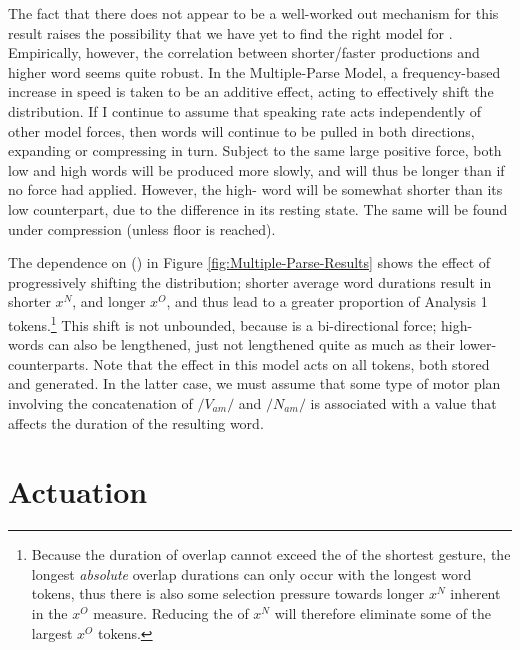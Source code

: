 The fact that there does not appear to be a well-worked out mechanism
for this result raises the possibility that we have yet to find the
right model for . Empirically, however, the correlation between
shorter/faster productions and higher word  seems quite robust.
In the Multiple-Parse Model, a frequency-based increase in 
speed is taken to be an additive effect, acting to effectively shift
the  distribution. If I continue to assume that speaking
rate acts independently of other model forces, then words will continue
to be pulled in both directions, expanding or compressing in turn.
Subject to the same large positive force, both low and high 
words will be produced more slowly, and will thus be longer than if
no force had applied. However, the high- word will be somewhat
shorter than its low  counterpart, due to the difference
in its resting state. The same will be found under compression (unless
floor is reached).

The dependence on  () in Figure \ref{fig:Multiple-Parse-Results}
shows the effect of progressively shifting the  distribution;
shorter average word durations result in shorter $x^{N}$, and longer
$x^{O}$, and thus lead to a greater proportion of Analysis 1 tokens.\footnote{Because the duration of overlap cannot exceed the  of the shortest
gesture, the longest \emph{absolute} overlap durations can only occur
with the longest word tokens, thus there is also some selection pressure
towards longer $x^{N}$ inherent in the $x^{O}$ measure. Reducing
the  of $x^{N}$ will therefore eliminate some of the largest
$x^{O}$ tokens.} This shift is not unbounded, because  is a bi-directional
force; high- words can also be lengthened, just not lengthened
quite as much as their lower- counterparts. Note that the
 effect in this model acts on all tokens, both stored and
generated. In the latter case, we must assume that some type of motor
plan involving the concatenation of $/V_{am}/$ and $/N_{am}/$ is
associated with a  value that affects the duration
of the resulting word. 

\section{Actuation}

